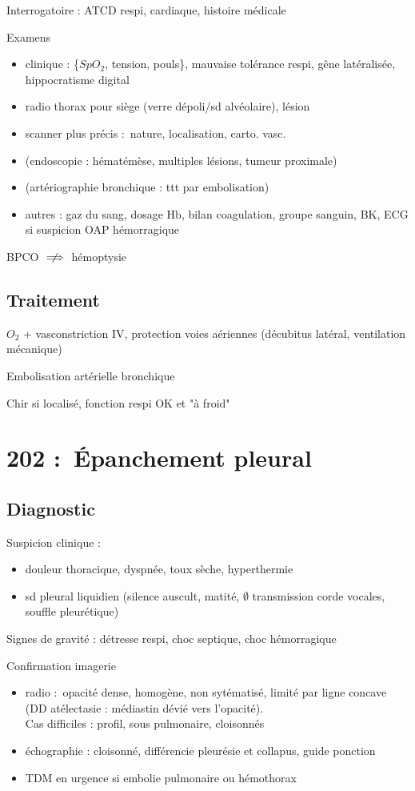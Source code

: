 \documentclass{article}
\begin{document}
Interrogatoire : ATCD respi, cardiaque, histoire médicale

Examens 
\begin{itemize}
\item clinique : \{$SpO_2$, tension, pouls\}, mauvaise tolérance respi, gêne
  latéralisée, hippocratisme digital
\item radio thorax pour siège (verre dépoli/sd alvéolaire), lésion
\item scanner plus précis : nature, localisation, carto. vasc.
\item (endoscopie : hématémèse, multiples lésions, tumeur proximale)
\item (artériographie bronchique : ttt par embolisation)
\item autres : gaz du sang, dosage Hb, bilan coagulation, groupe sanguin, {BK,
    ECG} si suspicion OAP hémorragique
\end{itemize}

\danger BPCO $\centernot\implies$ hémoptysie

\subsection{Traitement}
$O_2$ + vasconstriction IV, protection voies aériennes (décubitus latéral,
ventilation mécanique)

Embolisation artérielle bronchique

Chir si localisé, fonction respi OK et "à froid"

\section{202 : Épanchement pleural}%
\label{sec:epanchement_pleural}

\subsection{Diagnostic}
Suspicion clinique :
\begin{itemize}
\item douleur thoracique, dyspnée, toux sèche, hyperthermie
\item sd pleural liquidien (silence auscult, matité, $\emptyset$ transmission
  corde vocales, souffle pleurétique)
\end{itemize}
Signes de gravité : détresse respi, choc septique, choc hémorragique

Confirmation imagerie
\begin{itemize}
\item radio : opacité dense, homogène, non sytématisé, limité par ligne
  concave (DD atélectasie : médiastin dévié vers l'opacité). \\
  Cas difficiles : profil, sous pulmonaire, cloisonnés
\item échographie : cloisonné, différencie pleurésie et collapus, guide ponction
\item TDM en urgence si embolie pulmonaire ou hémothorax
\end{itemize}
\end{document}
